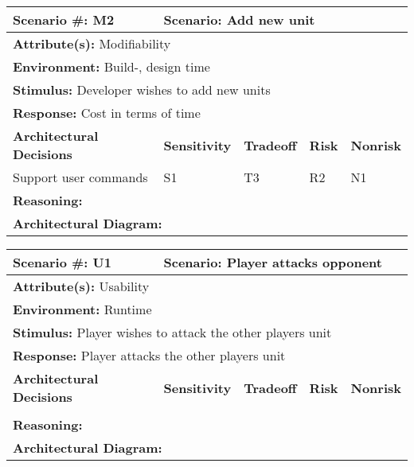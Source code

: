\begin{tabular}{|m{}|m{}|m{}|m{}|m{}|m{}|}
  \hline
  {\bf Scenario \#:} M2 & \multicolumn{5}{m{0.75 \textwidth}|}{{\bf Scenario:} Add new unit} \\ \hline
  \multicolumn{6}{|m{0.9 \textwidth}|}{{\bf Attribute(s):} Modifiability} \\ \hline
  \multicolumn{6}{|m{0.9 \textwidth}|}{{\bf Environment:} Build-, design time} \\ \hline
  \multicolumn{6}{|m{0.9 \textwidth}|}{{\bf Stimulus:} Developer wishes to add new units} \\ \hline
  \multicolumn{6}{|m{0.9 \textwidth}|}{{\bf Response:} Cost in terms of time} \\ \hline
  \multicolumn{2}{|m{0.3 \textwidth}|}{\bf Architectural Decisions} & {\bf Sensitivity} & {\bf Tradeoff} & {\bf Risk} & {\bf Nonrisk} \\ \hline
  \multicolumn{2}{|m{0.3 \textwidth}|}{Support user commands} & S1 & T3 & R2 & N1 \\ \hline
  \multicolumn{6}{|m{0.9 \textwidth}|}{{\bf Reasoning:} } \\ \hline
  \multicolumn{6}{|m{0.9 \textwidth}|}{{\bf Architectural Diagram:} } \\ \hline
\end{tabular}



\begin{tabular}{|m{}|m{}|m{}|m{}|m{}|m{}|}
  \hline
  {\bf Scenario \#:} U1 & \multicolumn{5}{m{0.75 \textwidth}|}{{\bf Scenario:} Player attacks opponent} \\ \hline
  \multicolumn{6}{|m{0.9 \textwidth}|}{{\bf Attribute(s):} Usability} \\ \hline
  \multicolumn{6}{|m{0.9 \textwidth}|}{{\bf Environment:} Runtime} \\ \hline
  \multicolumn{6}{|m{0.9 \textwidth}|}{{\bf Stimulus:} Player wishes to attack the other players unit} \\ \hline
  \multicolumn{6}{|m{0.9 \textwidth}|}{{\bf Response:} Player attacks the other players unit} \\ \hline
  \multicolumn{2}{|m{0.3 \textwidth}|}{\bf Architectural Decisions} & {\bf Sensitivity} & {\bf Tradeoff} & {\bf Risk} & {\bf Nonrisk} \\ \hline
  \multicolumn{2}{|m{0.3 \textwidth}|}{} &  &  &  &  \\ \hline
  \multicolumn{6}{|m{0.9 \textwidth}|}{{\bf Reasoning:} } \\ \hline
  \multicolumn{6}{|m{0.9 \textwidth}|}{{\bf Architectural Diagram:} } \\ \hline
\end{tabular}



